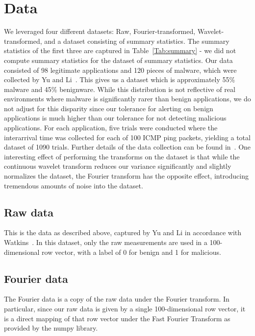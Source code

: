 \section{Data}\label{data}
We leveraged four different datasets: Raw, Fourier-transformed, Wavelet-transformed, and a dataset consisting of summary statistics.
The summary statistics of the first three are captured in Table~\ref{Tab:summary} - we did not compute summary statistics for the dataset of summary statistics.  
Our data consisted of 98 legitimate applications and 120 pieces of malware, which were collected by Yu and Li~\cite{yu2018network}.
This gives us a dataset which is approximately 55\% malware and 45\% benignware.
While this distribution is not reflective of real environments where malware is significantly rarer than benign applications, we do not adjust for this disparity since our tolerance for alerting on benign applications is much higher than our tolerance for not detecting malicious applications. 
For each application, five trials were conducted where the interarrival time was collected for each of 100 ICMP ping packets, yielding a total dataset of 1090 trials.
Further details of the data collection can be found in~\cite{yu2018network, watkins2013using}.
One interesting effect of performing the transforms on the dataset is that while the continuous wavelet transform reduces our variance significantly and slightly normalizes the dataset, the Fourier transform has the opposite effect, introducing tremendous amounts of noise into the dataset.

\subsection{Raw data}
This is the data as described above, captured by Yu and Li in accordance with Watkins~\cite{watkins2013using}.
In this dataset, only the raw measurements are used in a 100-dimensional row vector, with a label of 0 for benign and 1 for malicious.

\subsection{Fourier data}
The Fourier data is a copy of the raw data under the Fourier transform.
In particular, since our raw data is given by a single 100-dimensional row vector, it is a direct mapping of that row vector under the Fast Fourier Transform as provided by the numpy library.

